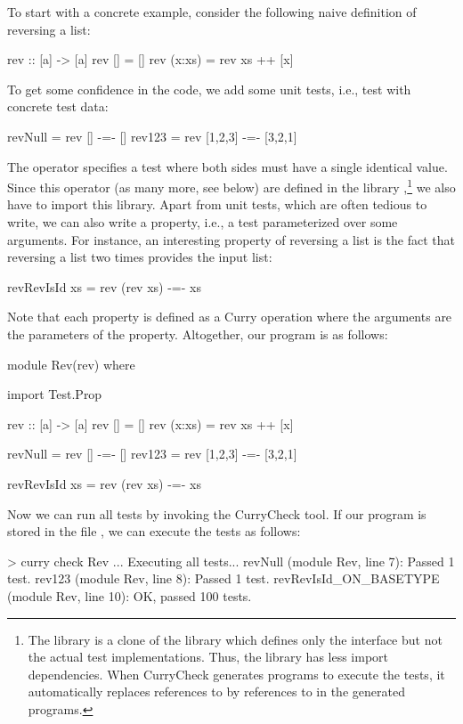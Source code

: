 To start with a concrete example, consider the following naive definition of
reversing a list:
\begin{curry}
rev :: [a] -> [a]
rev []     = []
rev (x:xs) = rev xs ++ [x]
\end{curry}
To get some confidence in the code, we add some unit tests,
i.e., test with concrete test data:
\begin{curry}
revNull = rev []      -=- []
rev123  = rev [1,2,3] -=- [3,2,1]
\end{curry}
The operator \ccode{-=-} specifies a test where both sides must
have a single identical value. Since this operator (as many more, see below)
are defined in the library ,\footnote{%
The library  is a clone of the library
which defines only the interface but not the actual test implementations.
Thus, the library  has less import dependencies.
When CurryCheck generates programs to execute the tests,
it automatically replaces references to 
by references to  in the generated programs.}
we also have to import this library.
Apart from unit tests, which are often tedious to write,
we can also write a property, i.e., a test parameterized over
some arguments. For instance, an interesting property of reversing a list
is the fact that reversing a list two times provides the input list:
\begin{curry}
revRevIsId xs = rev (rev xs) -=- xs
\end{curry}
Note that each property is defined as a Curry operation
where the arguments are the parameters of the property.
Altogether, our program is as follows:
\begin{curry}
module Rev(rev) where

import Test.Prop

rev :: [a] -> [a]
rev []     = []
rev (x:xs) = rev xs ++ [x]

revNull = rev []      -=- []
rev123  = rev [1,2,3] -=- [3,2,1]

revRevIsId xs = rev (rev xs) -=- xs
\end{curry}
Now we can run all tests by invoking the CurryCheck tool.
If our program is stored in the file ,
we can execute the tests as follows:
\begin{curry}
> curry check Rev
...
Executing all tests...
revNull (module Rev, line 7):
 Passed 1 test.
rev123 (module Rev, line 8):
 Passed 1 test.
revRevIsId_ON_BASETYPE (module Rev, line 10):
 OK, passed 100 tests.
\end{curry}
